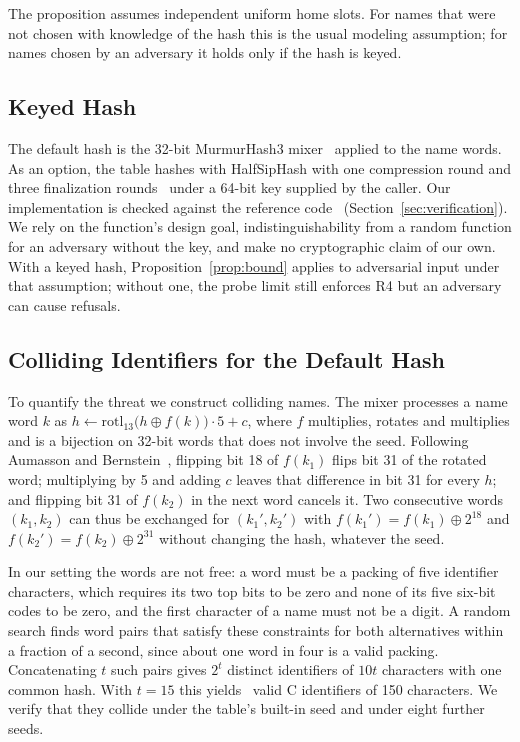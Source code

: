 The proposition assumes independent uniform home slots. For names that were not chosen with knowledge of the hash this is the usual modeling assumption; for names chosen by an adversary it holds only if the hash is keyed.

\subsection{Keyed Hash}
\label{sec:keyed}
The default hash is the 32-bit MurmurHash3 mixer~\cite{murmur3} applied to the name words. As an option, the table hashes with HalfSipHash with one compression round and three finalization rounds~\cite{aumasson2012,linuxsiphash} under a 64-bit key supplied by the caller. Our implementation is checked against the reference code~\cite{siphashref} (Section~\ref{sec:verification}). We rely on the function's design goal, indistinguishability from a random function for an adversary without the key, and make no cryptographic claim of our own. With a keyed hash, Proposition~\ref{prop:bound} applies to adversarial input under that assumption; without one, the probe limit still enforces R4 but an adversary can cause refusals.

\subsection{Colliding Identifiers for the Default Hash}
\label{sec:attack}
To quantify the threat we construct colliding names. The mixer processes a name word $k$ as $h \leftarrow \mathrm{rotl}_{13}\bigl(h \oplus f(k)\bigr)\cdot 5 + c$, where $f$ multiplies, rotates and multiplies and is a bijection on 32-bit words that does not involve the seed. Following Aumasson and Bernstein~\cite{aumasson2012,aumassonslides}, flipping bit 18 of $f(k_1)$ flips bit 31 of the rotated word; multiplying by 5 and adding $c$ leaves that difference in bit 31 for every $h$; and flipping bit 31 of $f(k_2)$ in the next word cancels it. Two consecutive words $(k_1,k_2)$ can thus be exchanged for $(k_1',k_2')$ with $f(k_1') = f(k_1) \oplus 2^{18}$ and $f(k_2') = f(k_2) \oplus 2^{31}$ without changing the hash, whatever the seed.

In our setting the words are not free: a word must be a packing of five identifier characters, which requires its two top bits to be zero and none of its five six-bit codes to be zero, and the first character of a name must not be a digit. A random search finds word pairs that satisfy these constraints for both alternatives within a fraction of a second, since about one word in four is a valid packing. Concatenating $t$ such pairs gives $2^{t}$ distinct identifiers of $10t$ characters with one common hash. With $t=15$ this yields \FloodN\ valid C identifiers of 150 characters. We verify that they collide under the table's built-in seed and under eight further seeds.

